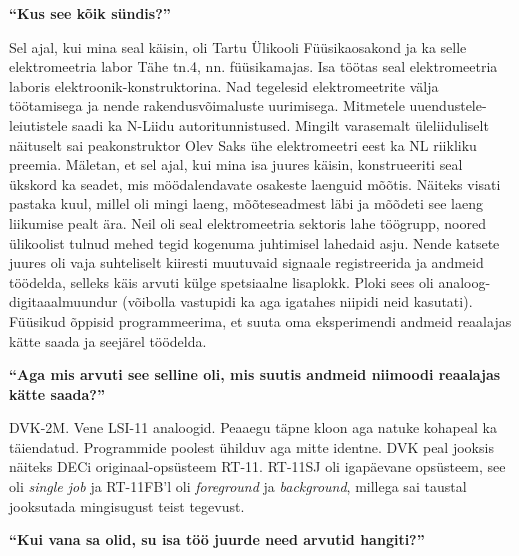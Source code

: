 \textbf{\enquote{Kus see kõik sündis?}}

Sel ajal, kui mina seal käisin, oli Tartu Ülikooli
Füüsikaosakond ja ka selle elektromeetria labor
Tähe tn.4, nn. füüsikamajas. Isa töötas seal elektromeetria laboris
elektroonik-konstruktorina. Nad tegelesid elektromeetrite välja töötamisega ja
nende rakendusvõimaluste uurimisega. Mitmetele uuendustele-leiutistele saadi ka
N-Liidu autoritunnistused. Mingilt varasemalt üleliiduliselt näituselt sai
peakonstruktor Olev Saks ühe elektromeetri eest ka NL riikliku preemia.
Mäletan, et sel ajal, kui mina isa juures käisin, konstrueeriti seal ükskord ka
seadet, mis möödalendavate osakeste laenguid mõõtis. Näiteks visati pastaka
kuul, millel oli mingi laeng, mõõteseadmest läbi ja mõõdeti see laeng liikumise
pealt ära. Neil oli seal elektromeetria sektoris lahe töögrupp, noored
ülikoolist tulnud mehed tegid kogenuma juhtimisel lahedaid asju. Nende katsete
juures oli vaja suhteliselt kiiresti muutuvaid signaale registreerida ja
andmeid töödelda, selleks käis arvuti külge spetsiaalne lisaplokk. Ploki sees
oli analoog-digitaaalmuundur (võibolla vastupidi ka aga igatahes niipidi neid
kasutati). Füüsikud õppisid programmeerima, et suuta oma eksperimendi andmeid
reaalajas kätte saada ja seejärel töödelda.

\textbf{\enquote{Aga mis arvuti see selline oli, mis suutis andmeid niimoodi
reaalajas kätte saada?}}

DVK-2M. Vene LSI-11
analoogid. Peaaegu täpne kloon aga natuke kohapeal ka täiendatud. Programmide
poolest ühilduv aga mitte identne. DVK peal jooksis näiteks DECi
originaal-opsüsteem RT-11. RT-11SJ oli igapäevane opsüsteem, see
oli \emph{single job} ja RT-11FB'l oli \emph{foreground} ja \emph{background},
millega sai taustal jooksutada mingisugust teist tegevust.

\textbf{\enquote{Kui vana sa olid, su isa töö juurde need arvutid hangiti?}}

